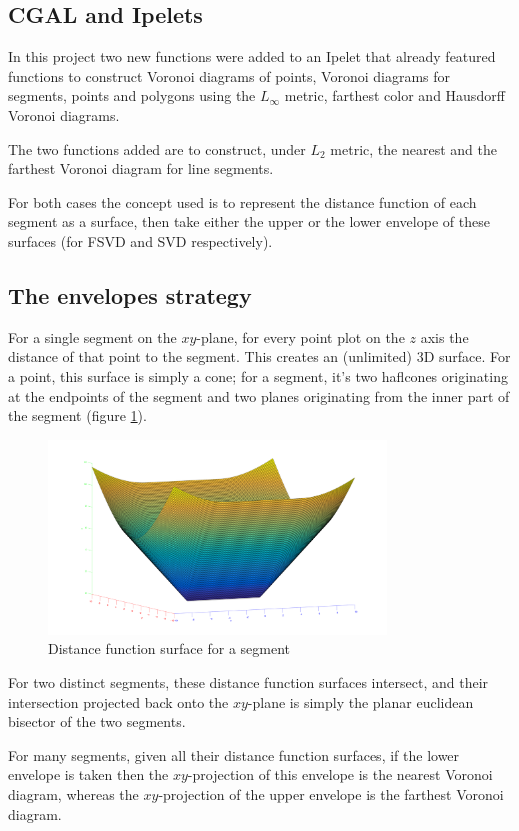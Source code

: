 \documentclass[11pt,a4paper,english]{article}
\begin{document}
	\subsection{CGAL and Ipelets}
	
	In this project two new functions were added to an Ipelet that already featured functions to construct Voronoi diagrams of points, Voronoi diagrams for segments, points and polygons using the \(L_{\infty}\) metric, farthest color and Hausdorff Voronoi diagrams.\par
	The two functions added are to construct, under \(L_{2}\) metric, the nearest and the farthest Voronoi diagram for line segments.\par
	For both cases the concept used is to represent the distance function of each segment as a surface, then take either the upper or the lower envelope of these surfaces (for FSVD and SVD respectively).
	
	\subsection{The envelopes strategy}
	For a single segment on the \(xy\)-plane, for every point plot on the \(z\) axis the distance of that point to the segment. This creates an (unlimited) 3D surface. For a point, this surface is simply a cone; for a segment, it's two haflcones originating at the endpoints of the segment and two planes originating from the inner part of the segment (figure \ref{fig:distance_function}).\par
	\begin{figure}[h]
    \centering
    \includegraphics[width=0.8\textwidth]{distance_function}
    \caption{Distance function surface for a segment\protect\footnotemark \label{fig:distance_function}}
	\end{figure}
	For two distinct segments, these distance function surfaces intersect, and their intersection projected back onto the \(xy\)-plane is simply the planar euclidean bisector of the two segments.\par
	For many segments, given all their distance function surfaces, if the lower envelope is taken then the \(xy\)-projection of this envelope is the nearest Voronoi diagram, whereas the \(xy\)-projection of the upper envelope is the farthest Voronoi diagram.
	
\end{document}

